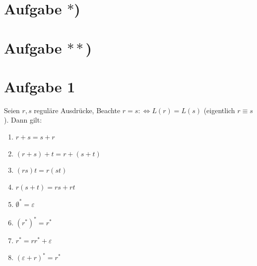 \documentclass[12pt,a4paper]{article}
\author{Willi Sontopski}
\begin{document}

\section*{Aufgabe $\ast$)}

\section*{Aufgabe $\ast\ast$)}

\section*{Aufgabe 1}
Seien $r,s$ reguläre Ausdrücke, Beachte $r=s:\Longleftrightarrow L(r)=L(s)$ (eigentlich $r\equiv s$). Dann gilt:
\begin{enumerate}[label=\alph*)]
	\item $r+s=s+r$
	\item $(r+s)+t=r+(s+t)$
	\item $(rs)t=r(st)$
	\item $r(s+t)=rs+rt$
	\item $\emptyset^\ast=\varepsilon$
	\item $(r^\ast)^\ast=r^\ast$
	\item $r^\ast=rr^\ast+\varepsilon$
	\item $(\varepsilon+r)^\ast=r^\ast$
\end{enumerate}
\end{document}
